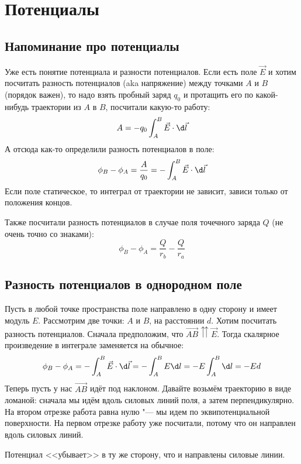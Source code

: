 \chapter{Потенциалы}

\section{Напоминание про потенциалы}
  Уже есть понятие потенциала и разности потенциалов.
  Если есть поле $\vec E$ и хотим посчитать разность потенциалов (aka напряжение) между точками $A$ и $B$ (порядок важен),
  то надо взять пробный заряд $q_0$ и протащить его по какой-нибудь траектории из $A$ в $B$,
  посчитали какую-то работу:
  \[A = -q_0 \int_A^B \vec E \cdot \d\vec l\]
  А отсюда как-то определили разность потенциалов в поле:
  \[\phi_B-\phi_A = \frac{A}{q_0} = -\int_A^B \vec E \cdot \d \vec l\]
  Если поле статическое, то интеграл от траектории не зависит, зависи только от положения концов.

  Также посчитали разность потенциалов в случае поля точечного заряда $Q$ (не очень точно со знаками):
  \[ \phi_B-\phi_A = \frac{Q}{r_b} - \frac{Q}{r_a}\]

\section{Разность потенциалов в однородном поле}
  Пусть в любой точке пространства поле направлено в одну сторону и имеет модуль $E$.
  Рассмотрим две точки: $A$ и $B$, на расстоянии $d$.
  Хотим посчитать разность потенциалов.
  Сначала предположим, что $\vec{AB} \upuparrows \vec E$.
  Тогда скалярное произведение в интеграле заменяется на обычное:
  \[\phi_B - \phi_A = -\int_A^B \vec E \cdot \d \vec l = -\int_A^B E \d l = -E \int_A^B \d l = -Ed \]
  Теперь пусть у нас $\vec{AB}$ идёт под наклоном.
  Давайте возьмём траекторию в виде ломаной: сначала мы идём вдоль силовых линий поля, а затем перпендикулярно.
  На втором отрезке работа равна нулю "--- мы идем по эквипотенциальной поверхности.
  На первом отрезке работу уже посчитали, потому что он направлен вдоль силовых линий.
  \begin{Rem}
    Потенциал <<убывает>> в ту же сторону, что и направлены силовые линии.
  \end{Rem}

